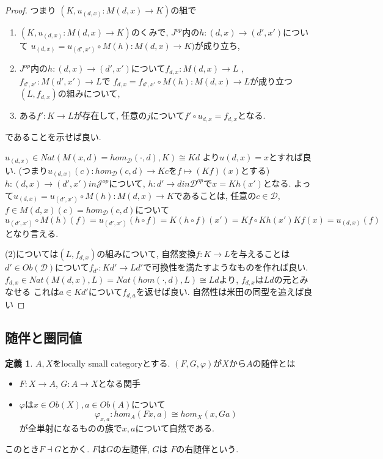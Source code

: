 \documentclass[dvipdfmx,a4paper,11pt]{article}
\theoremstyle{definition}
\newtheorem{dfn}[thm]{定義}
\begin{document}
\begin{proof}
つまり
$(K, u_{(d,x)}: M(d,x) \to K)$の組で
\begin{enumerate}
\item $(K, u_{(d,x)}: M(d,x) \to K)$のくみで, $J ^{op}$内の$h : (d,x)\to (d',x')$について
$u_{(d,x)}  = u_{(d',x')} \circ M(h) : M(d ,x) \to K)$が成り立ち, 
\item $J ^{op}$内の$h : (d,x)\to (d',x')$について$f_{d,x} : M(d,x) \to L$
, $f_{d',x'} : M(d',x') \to L$で
$f_{d,x}  = f_{d',x'}\circ M(h) : M(d,x) \to L$が成り立つ$(L, f_{d,x})$の組みについて,
\item ある$f' : K \to L$が存在して, 任意の$j$について$f' \circ u_{d,x} = f_{d,x}$となる.
\end{enumerate}
であることを示せば良い.

$u_{(d,x)} \in Nat(M(x, d)=hom_{\mathcal{D}}(\cdot, d), K) \cong Kd$
より$u{(d,x)} = x$とすれば良い. 
(つまり$u_{(d,x)}(c) : hom_{\mathcal{D}}(c, d) \to  Kc$を$f \mapsto (Kf)(x)$とする)
$h : (d,x)  \to (d',x') in \mathcal{J}^{op} $について, 
$h : d'  \to d in \mathcal{D}^{op}$で$x = Kh(x')$となる. 
よって$u_{(d,x)}  = u_{(d',x')} \circ M(h) : M(d ,x) \to K$であることは, 
任意の$c \in \mathcal{D}$, $f \in M(d ,x)(c) = hom_{\mathcal{D}}(c, d) $について
$$
u_{(d',x')} \circ M(h) (f)
= u_{(d',x')} (h \circ f) 
=K(h \circ f) (x')
=Kf\circ Kh (x')
Kf (x)=u_{(d,x)}(f) 
$$
となり言える. 

(2)については$(L, f_{d,x})$の組みについて, 
自然変換$f : K \to L$を与えることは$d' \in Ob(\mathcal{D})$について$f_{d'} : Kd' \to Ld'$で可換性を満たすようなものを作れば良い. $f_{d,x} \in Nat( M(d,x), L)=Nat( hom(\cdot,d), L)\cong Ld$より, $f_{d,x}$は$Ld$の元とみなせる
これは$a \in Kd'$について$f_{d,a}$を返せば良い. 
自然性は米田の同型を追えば良い
\end{proof}

\subsection{随伴と圏同値}
 \begin{tcolorbox}
 [colback = white, colframe = green!35!black, fonttitle = \bfseries,breakable = true]
\begin{dfn}
$A,X$をlocally small categoryとする.
$(F,G,\varphi)$が$X$から$A$の随伴とは
\begin{itemize}
\item $F :X \to A$, $G : A \to X$となる関手
\item $\varphi$は$x \in Ob(X), a \in Ob(A)$について
$$
\varphi_{x,a} : hom_{A}(Fx, a) \cong hom_{X}(x, Ga)
$$
が全単射になるものの族で$x,a$について自然である. 
\end{itemize}
このとき$F\dashv G$とかく.
$F$は$G$の左随伴, $G$は $F$の右随伴という. 
\end{dfn}
\end{tcolorbox}
\end{document}
